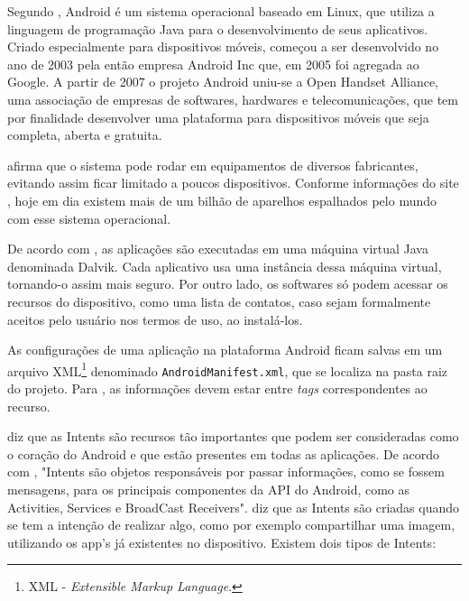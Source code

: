 
	\par Segundo , Android é um sistema operacional
baseado em Linux, que utiliza a linguagem de programação Java para o
desenvolvimento de seus aplicativos. Criado especialmente para dispositivos
móveis, começou a ser desenvolvido no ano de 2003 pela então empresa Android
Inc que, em 2005 foi agregada ao Google. A partir de 2007 o projeto Android
uniu-se a Open Handset Alliance, uma associação de empresas de
softwares, hardwares e telecomunicações, que tem por finalidade desenvolver uma
plataforma para dispositivos móveis que seja completa, aberta e gratuita.

	\par {} afirma que o sistema pode rodar em equipamentos
de diversos fabricantes, evitando assim ficar limitado a poucos dispositivos.
Conforme informações do site , hoje em dia existem mais de
um bilhão de aparelhos espalhados pelo mundo com esse sistema operacional.

	\par De acordo com , as aplicações são executadas em
uma máquina virtual Java denominada Dalvik. Cada aplicativo usa uma instância
dessa máquina virtual, tornando-o assim mais seguro. Por outro lado, os
softwares só podem acessar os recursos do dispositivo, como uma lista de
contatos, caso sejam formalmente aceitos pelo usuário nos termos de uso, ao
instalá-los.

	\par As configurações de uma aplicação na plataforma Android ficam salvas em um
arquivo XML\footnote{XML - \textit{Extensible Markup Language}.} denominado
\texttt{AndroidManifest.xml}, que se localiza na pasta raiz do projeto. Para
, as informações devem estar entre \textit{tags}
correspondentes ao recurso.

	\par {} diz que as Intents são recursos tão importantes
que podem ser consideradas como o coração do Android e que estão presentes em
todas as aplicações.	De acordo com , "Intents são
objetos responsáveis por passar informações, como se fossem mensagens, para os
principais componentes da API do Android, como as Activities, Services e
BroadCast Receivers".  diz que as Intents são criadas
quando se tem a intenção de realizar algo, como por exemplo compartilhar uma
imagem, utilizando os app's já existentes no dispositivo. Existem dois tipos de
Intents:
	
